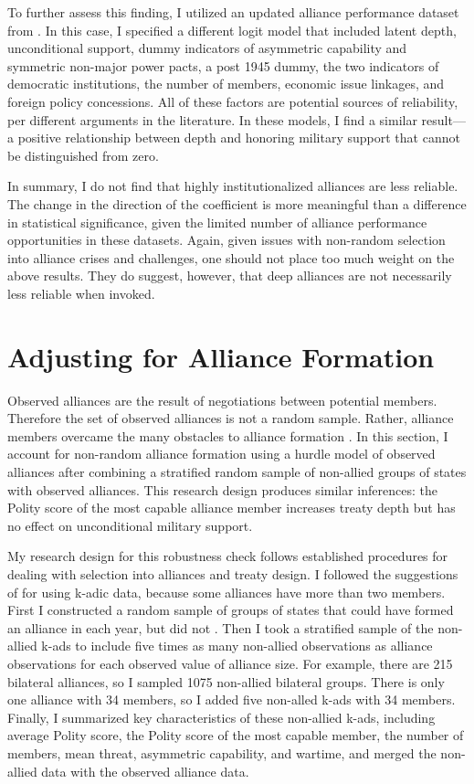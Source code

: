 \documentclass[12pt]{article}
\begin{document}
To further assess this finding, I utilized an updated alliance performance dataset from \citet{BerkemeierFuhrmann2018}.
In this case, I specified a different logit model that included latent depth, unconditional support, dummy indicators of asymmetric capability and symmetric non-major power pacts, a post 1945 dummy, the two indicators of democratic institutions, the number of members, economic issue linkages, and foreign policy concessions. 
All of these factors are potential sources of reliability, per different arguments in the literature. 
In these models, I find a similar result--- a positive relationship between depth and honoring military support that cannot be distinguished from zero.


In summary, I do not find that highly institutionalized alliances are less reliable. 
The change in the direction of the coefficient is more meaningful than a difference in statistical significance, given the limited number of alliance performance opportunities in these datasets. 
Again, given issues with non-random selection into alliance crises and challenges, one should not place too much weight on the above results. 
They do suggest, however, that deep alliances are not necessarily less reliable when invoked. 


\section{Adjusting for Alliance Formation}


Observed alliances are the result of negotiations between potential members. 
Therefore the set of observed alliances is not a random sample.
Rather, alliance members overcame the many obstacles to alliance formation \citep{Poast2019a}.  
In this section, I account for non-random alliance formation using a hurdle model of observed alliances after combining a stratified random sample of non-allied groups of states with observed alliances. 
This research design produces similar inferences: the Polity score of the most capable alliance member increases treaty depth but has no effect on unconditional military support. 


My research design for this robustness check follows established procedures for dealing with selection into alliances and treaty design. 
I followed the suggestions of \citet{Poast2010} for using k-adic data, because some alliances have more than two members. 
First I constructed a random sample of groups of states that could have formed an alliance in each year, but did not \citep{FordhamPoast2014}.
Then I took a stratified sample of the non-allied k-ads to include five times as many non-allied observations as alliance observations for each observed value of alliance size. 
For example, there are 215 bilateral alliances, so I sampled 1075 non-allied bilateral groups. 
There is only one alliance with 34 members, so I added five non-alled k-ads with 34 members. 
Finally, I summarized key characteristics of these non-allied k-ads, including average Polity score, the Polity score of the most capable member, the number of members, mean threat, asymmetric capability, and wartime, and merged the non-allied data with the observed alliance data. 
\end{document}
